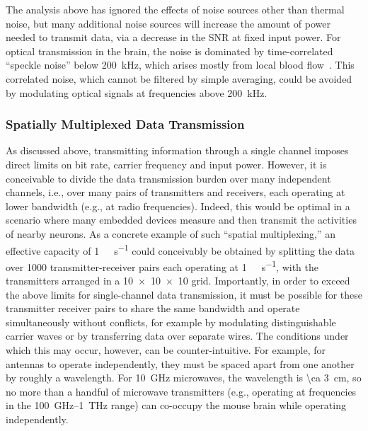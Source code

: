 The analysis above has ignored the effects of noise sources other than thermal noise, but many additional noise sources will increase the amount of power needed to transmit data, via a decrease in the SNR at fixed input power.
For optical transmission in the brain, the noise is dominated by time-correlated ``speckle noise'' below \SI{200}{\kilo\hertz}, which arises mostly from local blood flow~\cite{carp11}.
This correlated noise, which cannot be filtered by simple averaging, could be avoided by modulating optical signals at frequencies above \SI{200}{\kHz}.

\subsubsection{Spatially Multiplexed Data Transmission}

As discussed above, transmitting information through a single channel imposes direct limits on bit rate, carrier frequency and input power.
However, it is conceivable to divide the data transmission burden over many independent channels, i.e., over many pairs of transmitters and receivers, each operating at lower bandwidth (e.g., at radio frequencies).
Indeed, this would be optimal in a scenario where many embedded devices measure and then transmit the activities of nearby neurons.
As a concrete example of such ``spatial multiplexing,'' an effective capacity of \SI{1}{\tera\bit\per\second} could conceivably be obtained by splitting the data over \num{1000} transmitter-receiver pairs each operating at \SI{1}{\giga\bit\per\second}, with the transmitters arranged in a \num{10 x 10 x 10} grid.
Importantly, in order to exceed the above limits for single-channel data transmission, it must be possible for these transmitter receiver pairs to share the same bandwidth and operate simultaneously without conflicts, for example by modulating distinguishable carrier waves or by transferring data over separate wires.
The conditions under which this may occur, however, can be counter-intuitive.
For example, for antennas to operate independently, they must be spaced apart from one another by roughly a wavelength.
For \SI{10}{\giga\hertz} microwaves, the wavelength is \SI{\ca 3}{\centi\meter}, so no more than a handful of microwave transmitters (e.g., operating at frequencies in the \SI{100}{\giga\hertz}--\SI{1}{\tera\hertz} range) can co-occupy the mouse brain while operating independently.

